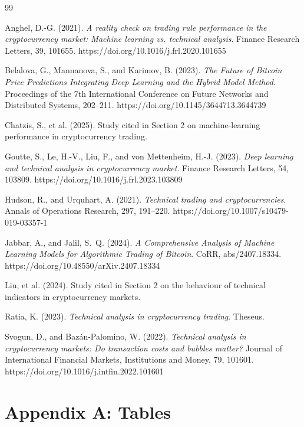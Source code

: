 \documentclass[12pt]{article}
\begin{document}
\begingroup
\singlespacing
\begin{thebibliography}{99}

\bibitem{} Anghel, D.-G. (2021). \textit{A reality check on trading rule performance in the cryptocurrency market: Machine learning vs. technical analysis}. Finance Research Letters, 39, 101655. https://doi.org/10.1016/j.frl.2020.101655

\bibitem{} Belalova, G., Mannanova, S., and Karimov, B. (2023). \textit{The Future of Bitcoin Price Predictions Integrating Deep Learning and the Hybrid Model Method}. Proceedings of the 7th International Conference on Future Networks and Distributed Systems, 202--211. https://doi.org/10.1145/3644713.3644739

\bibitem{} Chatzis, S., et al. (2025). Study cited in Section 2 on machine-learning performance in cryptocurrency trading.

\bibitem{} Goutte, S., Le, H.-V., Liu, F., and von Mettenheim, H.-J. (2023). \textit{Deep learning and technical analysis in cryptocurrency market}. Finance Research Letters, 54, 103809. https://doi.org/10.1016/j.frl.2023.103809

\bibitem{} Hudson, R., and Urquhart, A. (2021). \textit{Technical trading and cryptocurrencies}. Annals of Operations Research, 297, 191--220. https://doi.org/10.1007/s10479-019-03357-1

\bibitem{} Jabbar, A., and Jalil, S.~Q. (2024). \textit{A Comprehensive Analysis of Machine Learning Models for Algorithmic Trading of Bitcoin}. CoRR, abs/2407.18334. https://doi.org/10.48550/arXiv.2407.18334

\bibitem{} Liu, et al. (2024). Study cited in Section 2 on the behaviour of technical indicators in cryptocurrency markets.

\bibitem{} Ratia, K. (2023). \textit{Technical analysis in cryptocurrency trading}. Theseus.

\bibitem{} Svogun, D., and Baz\'an-Palomino, W. (2022). \textit{Technical analysis in cryptocurrency markets: Do transaction costs and bubbles matter?} Journal of International Financial Markets, Institutions and Money, 79, 101601. https://doi.org/10.1016/j.intfin.2022.101601

\end{thebibliography}
\endgroup

\clearpage
\appendix
\section{Appendix A: Tables}
\label{app:tables}
\end{document}
